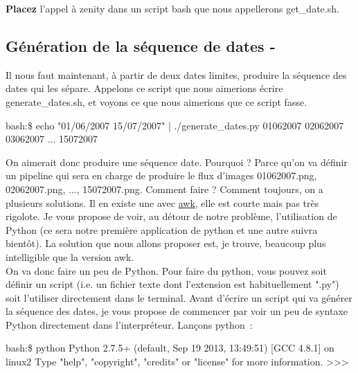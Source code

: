 \textbf{Placez} l'appel à zenity dans un script bash que nous appellerons get\_date.sh.


\subsection{Génération de la séquence de dates - \python}

Il nous faut maintenant, à partir de deux dates limites, produire la séquence des dates qui les sépare. Appelons ce script que nous aimerions écrire generate\_dates.sh, et voyons ce que nous aimerions que ce script fasse.
\begin{exempleResultat}
bash:\$ echo "01/06/2007 15/07/2007" | ./generate\_dates.py 
01062007
02062007
03062007
...
15072007
\end{exempleResultat}
On aimerait donc produire une séquence date. Pourquoi ? Parce qu'on va définir un pipeline qui sera en charge de produire le flux d'images 01062007.png, 02062007.png, ..., 15072007.png. Comment faire ? Comment toujours, on a plusieurs solutions. Il en existe une avec \href{http://stackoverflow.com/questions/4351282/how-to-generate-a-sequence-of-dates-given-starting-and-ending-dates-using-awk-of}{awk}, elle est courte mais pas très rigolote. Je vous propose de voir, au détour de notre problème, l'utilisation de Python (ce sera notre première application de python et une autre suivra bientôt). La solution que nous allons proposer est, je trouve, beaucoup plus intelligible que la version awk.\\

On va donc faire un peu de Python. Pour faire du python, vous pouvez soit définir un script (i.e. un fichier texte dont l'extension est habituellement ".py") soit l'utiliser directement dans le terminal. Avant d'écrire un script qui va générer la séquence des dates, je vous propose de commencer par voir un peu de syntaxe Python directement dans l'interpréteur. Lançons python~:
\begin{exempleResultat}
bash:\$ python
Python 2.7.5+ (default, Sep 19 2013, 13:49:51) 
[GCC 4.8.1] on linux2
Type "help", "copyright", "credits" or "license" for more information.
>>>
\end{exempleResultat}

